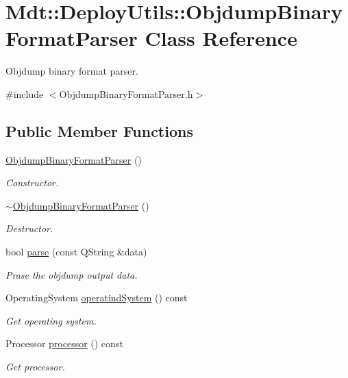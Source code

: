 \hypertarget{class_mdt_1_1_deploy_utils_1_1_objdump_binary_format_parser}{}\section{Mdt\+:\+:Deploy\+Utils\+:\+:Objdump\+Binary\+Format\+Parser Class Reference}
\label{class_mdt_1_1_deploy_utils_1_1_objdump_binary_format_parser}


Objdump binary format parser.  




{\ttfamily \#include $<$Objdump\+Binary\+Format\+Parser.\+h$>$}

\subsection*{Public Member Functions}
\begin{DoxyCompactItemize}
\item 
\hyperlink{class_mdt_1_1_deploy_utils_1_1_objdump_binary_format_parser_ab2f0bcb7702627750646fb6efeb50015}{Objdump\+Binary\+Format\+Parser} ()
\begin{DoxyCompactList}\small\item\em Constructor. \end{DoxyCompactList}\item 
\hyperlink{class_mdt_1_1_deploy_utils_1_1_objdump_binary_format_parser_a9715218199f46b21e7f217d22e6eed5b}{$\sim$\+Objdump\+Binary\+Format\+Parser} ()
\begin{DoxyCompactList}\small\item\em Destructor. \end{DoxyCompactList}\item 
bool \hyperlink{class_mdt_1_1_deploy_utils_1_1_objdump_binary_format_parser_a83e87522f42004c12d61301bbc0f1b3d}{parse} (const Q\+String \&data)
\begin{DoxyCompactList}\small\item\em Prase the objdump output data. \end{DoxyCompactList}\item 
Operating\+System \hyperlink{class_mdt_1_1_deploy_utils_1_1_objdump_binary_format_parser_a694b0f3588b82a98f8e6dc79b0647c53}{operatind\+System} () const 
\begin{DoxyCompactList}\small\item\em Get operating system. \end{DoxyCompactList}\item 
Processor \hyperlink{class_mdt_1_1_deploy_utils_1_1_objdump_binary_format_parser_a7348b1d1b12576a2de454dfd162ef41a}{processor} () const 
\begin{DoxyCompactList}\small\item\em Get processor. \end{DoxyCompactList}\end{DoxyCompactItemize}


